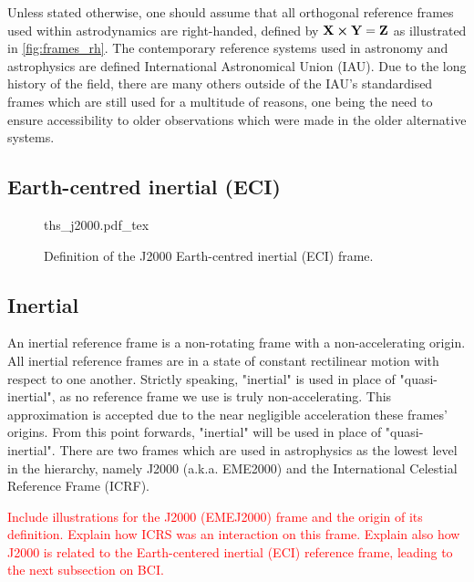 Unless stated otherwise, one should assume that all orthogonal reference frames
used within astrodynamics are right-handed, defined by
$\mathbf{X}\cross{\mathbf{Y}}=\mathbf{Z}$ as illustrated in
\autoref{fig:frames_rh}. The contemporary reference systems used in astronomy
and astrophysics are defined International Astronomical Union (IAU). Due to the
long history of the field, there are many others outside of the IAU's
standardised frames which are still used for a multitude of reasons, one being
the need to ensure accessibility to older observations which were made in the
older alternative systems.

\subsection{Earth-centred inertial (ECI)\label{ssec:frame_intertial}}

\begin{figure}[h]
    \centering
    \def\svgwidth{0.75\linewidth}
    {ths_j2000.pdf_tex}
    \caption{Definition of the J2000 Earth-centred inertial (ECI) frame.}
    \label{fig:my_label}
\end{figure}

\subsection{Inertial\label{ssec:frame_intertial}}

An inertial reference frame is a non-rotating frame with a non-accelerating
origin. All inertial reference frames are in a state of constant rectilinear
motion with respect to one another. Strictly speaking, "inertial" is used in
place of "quasi-inertial", as no reference frame we use is truly
non-accelerating. This approximation is accepted due to the near negligible
acceleration these frames' origins. From this point forwards, "inertial" will be
used in place of "quasi-inertial". There are two frames which are used in
astrophysics as the lowest level in the hierarchy, namely J2000 (a.k.a. EME2000)
and the International Celestial Reference Frame (ICRF).

\textcolor{red}{Include illustrations for the J2000 (EMEJ2000) frame and the
origin of its definition. Explain how ICRS was an interaction on this frame.
Explain also how J2000 is related to the Earth-centered inertial (ECI) reference
frame, leading to the next subsection on BCI.}

